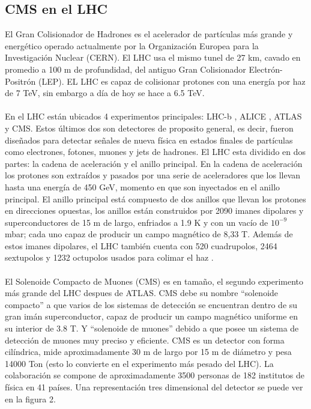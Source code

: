 \subsection{CMS en el LHC}
El Gran Colisionador de Hadrones es el acelerador de partículas más grande y energético operado actualmente por la Organización Europea para la Investigación Nuclear (CERN). El LHC usa el mismo tunel de 27 km, cavado en promedio a 100 m de profundidad, del antiguo Gran Colisionador Electrón-Positrón (LEP). EL LHC es capaz de colisionar protones con una energía por haz de 7 TeV, sin embargo a día de hoy se hace a 6.5 TeV.
\\
\\
En el LHC están ubicados 4 experimentos principales: LHC-b \cite{Alves:2008zz}, ALICE \cite{Aamodt:2008zz}, ATLAS \cite{Aad:2008zzm} y CMS. Estos últimos dos son detectores de proposito general, es decir, fueron diseñados para detectar señales de nueva física en estados finales de partículas como electrones, fotones, muones y jets de hadrones. El LHC esta dividido en dos partes: la cadena de aceleración y el anillo principal. En la cadena de aceleración los protones son extraídos y pasados por una serie de aceleradores que los llevan hasta una energía de 450 GeV, momento en que son inyectados en el anillo principal. El anillo principal está compuesto de dos anillos que llevan los protones en direcciones opuestas, los anillos están construidos por 2090 imanes dipolares y superconductores de 15 m de largo, enfriados a 1.9 K y con un vacío de $10^{-9}$mbar; cada uno capaz de producir un campo magnético de 8,33 T. Además de estos imanes dipolares, el LHC también cuenta con 520 cuadrupolos, 2464 sextupolos y 1232 octupolos usados para colimar el haz \cite{RuizAlvarez:2016mhn}. 
\\
\\
El Solenoide Compacto de Muones (CMS) es en tamaño, el segundo experimento más grande del LHC despues de ATLAS. CMS debe su nombre ``solenoide compacto'' a que varios de los sistemas de detección se encuentran dentro de su gran imán superconductor, capaz de producir un campo magnético uniforme en su interior de 3.8 T. Y ``solenoide de muones'' debido a que posee un sistema de detección de muones muy preciso y eficiente. CMS es un detector con forma cilíndrica, mide aproximadamente 30 m de largo por 15 m de diámetro y pesa 14000 Ton (esto lo convierte en el experimento más pesado del LHC). La colaboración se compone de aproximadamente 3500 personas de 182 institutos de física en 41 países. Una representación tres dimensional del detector se puede ver en la figura 2.
